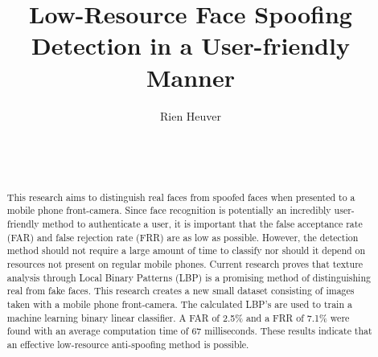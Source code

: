 \documentclass{sig-alternate-br}
\begin{document}
	

\title{Low-Resource Face Spoofing Detection in a User-friendly Manner}



\author{
\alignauthor
Rien Heuver\\
       \\
       \\
       \\
}

\maketitle

\begin{abstract}
This research aims to distinguish real faces from spoofed faces when presented to a mobile phone front-camera. Since face recognition is potentially an incredibly user-friendly method to authenticate a user, it is important that the false acceptance rate (FAR) and false rejection rate (FRR) are as low as possible. However, the detection method should not require a large amount of time to classify nor should it depend on resources not present on regular mobile phones. Current research proves that texture analysis through Local Binary Patterns (LBP) is a promising method of distinguishing real from fake faces. This research creates a new small dataset consisting of images taken with a mobile phone front-camera. The calculated LBP's are used to train a machine learning binary linear classifier. A FAR of 2.5\% and a FRR of 7.1\% were found with an average computation time of 67 milliseconds. These results indicate that an effective low-resource anti-spoofing method is possible.
\end{abstract}
\end{document}

